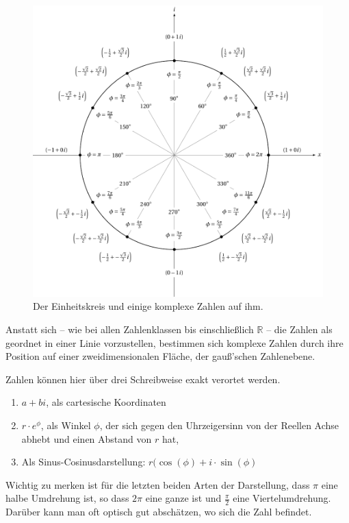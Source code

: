 \documentclass{scrartcl}
\begin{document}
\begin{figure}[h!]
	\includegraphics[width=\textwidth]{unit.pdf}
	\caption{Der Einheitskreis und einige komplexe Zahlen auf ihm.}
\end{figure}

Anstatt sich -- wie bei allen Zahlenklassen bis einschließlich $\mathbb{R}$ -- die Zahlen als geordnet in einer Linie vorzustellen,
bestimmen sich komplexe Zahlen durch ihre Position auf einer zweidimensionalen Fläche, der gauß'schen Zahlenebene.

Zahlen können hier über drei Schreibweise exakt verortet werden.

\begin{enumerate}
	\item $a + bi$, als cartesische Koordinaten
	\item $r \cdot e^\phi$, als Winkel $\phi$, der sich gegen den Uhrzeigersinn von der Reellen Achse abhebt und einen Abstand
		von $r$ hat,
	\item Als Sinus-Cosinusdarstellung: $r (\cos(\phi) + i\cdot\sin(\phi)$
\end{enumerate}

Wichtig zu merken ist für die letzten beiden Arten der Darstellung, dass $\pi$ eine halbe Umdrehung ist, so dass $2\pi$ eine ganze ist
und $\frac{\pi}{2}$ eine Viertelumdrehung. Darüber kann man oft optisch gut abschätzen, wo sich die Zahl befindet.
\end{document}
